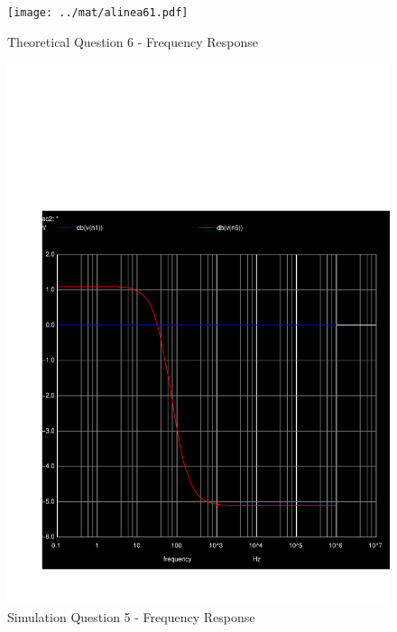 \begin{figure}[H]
      \texttt{[image: ../mat/alinea61.pdf]}
      \caption{Theoretical Question 6 - Frequency Response}
    \endminipage\hfill
      \includegraphics[width=\linewidth]{../sim/fresponse.pdf}
      \caption{Simulation Question 5 - Frequency Response}
    \endminipage\hfill
\end{figure}
